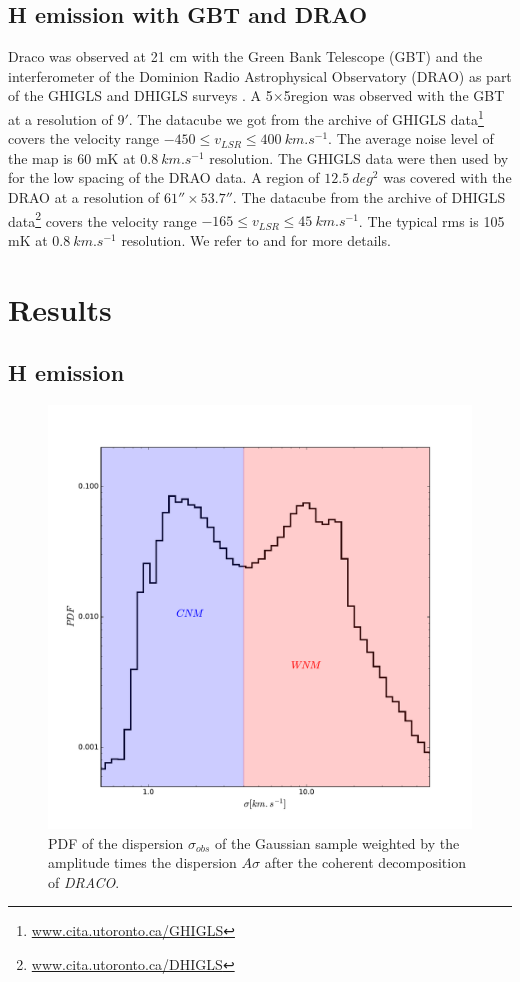 \documentclass[traditabstract]{aa}
\begin{document}
\subsection{H emission with GBT and DRAO}
Draco was observed at 21 cm with the Green Bank Telescope (GBT) and the interferometer of the Dominion Radio Astrophysical 
Observatory (DRAO) as part of the GHIGLS and DHIGLS surveys \citep{Martin_2015,Blagrave_2017}.
A 5\degree$\times $5\degree region was observed with the GBT at a resolution of $9'$. The datacube we got from the archive 
of GHIGLS data\footnote{\url{www.cita.utoronto.ca/GHIGLS}} covers the velocity range $-450\leq v_{LSR}\leq 400\: km.s^{-1}$. 
The average noise level of the map is 60 mK at $0.8\: km.s^{-1}$ resolution.
The GHIGLS data were then used by \cite{Blagrave_2017} for the low spacing of the DRAO data. A region of $12.5\: deg^2$ 
was covered with the DRAO at a resolution of $61''\times 53.7''$. The datacube from the archive of 
DHIGLS data\footnote{\url{www.cita.utoronto.ca/DHIGLS}} covers the velocity range $-165\leq v_{LSR}\leq 45\: km.s^{-1}$. 
The typical rms is 105 mK at $0.8\: km.s^{-1}$ resolution.
We refer to \cite{Martin_2015} and \cite{Blagrave_2017} for more details.

\section{Results}
\label{sec:Res}
\subsection{H emission}
\label{sec:HI-data}
\begin{figure}
   \includegraphics[width=\linewidth]{Figures/PDF_sigma_over_A.pdf}
   \caption{PDF of the dispersion $\sigma_{obs}$ of the Gaussian sample weighted by the amplitude times the dispersion $A\sigma$ 
     after the coherent decomposition of \textit{DRACO}.}
   \label{fig::PDF_sigma_over_A}
\end{figure}
\end{document}
